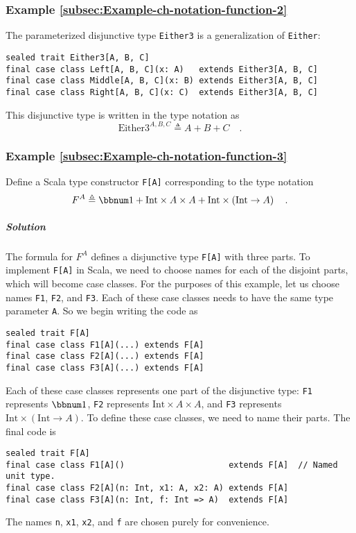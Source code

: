 \subsubsection{Example \label{subsec:Example-ch-notation-function-2}\ref{subsec:Example-ch-notation-function-2}}

The parameterized disjunctive type \lstinline!Either3! is a generalization
of \lstinline!Either!:
\begin{lstlisting}
sealed trait Either3[A, B, C]
final case class Left[A, B, C](x: A)   extends Either3[A, B, C]
final case class Middle[A, B, C](x: B) extends Either3[A, B, C]
final case class Right[A, B, C](x: C)  extends Either3[A, B, C]
\end{lstlisting}
This disjunctive type is written in the type notation as
\[
\text{Either3}^{A,B,C}\triangleq A+B+C\quad.
\]


\subsubsection{Example \label{subsec:Example-ch-notation-function-3}\ref{subsec:Example-ch-notation-function-3}}

Define a Scala type constructor \lstinline!F[A]! corresponding to
the type notation 
\[
F^{A}\triangleq\bbnum 1+\text{Int}\times A\times A+\text{Int}\times\left(\text{Int}\rightarrow A\right)\quad.
\]


\subparagraph{Solution}

The formula for $F^{A}$ defines a disjunctive type \lstinline!F[A]!
with three parts. To implement \lstinline!F[A]! in Scala, we need
to choose names for each of the disjoint parts, which will become
case classes. For the purposes of this example, let us choose names
\lstinline!F1!, \lstinline!F2!, and \lstinline!F3!. Each of these
case classes needs to have the same type parameter \lstinline!A!.
So we begin writing the code as
\begin{lstlisting}
sealed trait F[A]
final case class F1[A](...) extends F[A]
final case class F2[A](...) extends F[A]
final case class F3[A](...) extends F[A]
\end{lstlisting}
Each of these case classes represents one part of the disjunctive
type: \lstinline!F1! represents $\bbnum 1$, \lstinline!F2! represents
$\text{Int}\times A\times A$, and \lstinline!F3! represents $\text{Int}\times\left(\text{Int}\rightarrow A\right)$.
To define these case classes, we need to name their parts. The final
code is
\begin{lstlisting}
sealed trait F[A]
final case class F1[A]()                     extends F[A]  // Named unit type.
final case class F2[A](n: Int, x1: A, x2: A) extends F[A]
final case class F3[A](n: Int, f: Int => A)  extends F[A]
\end{lstlisting}
The names \lstinline!n!, \lstinline!x1!, \lstinline!x2!, and \lstinline!f!
are chosen purely for convenience.

